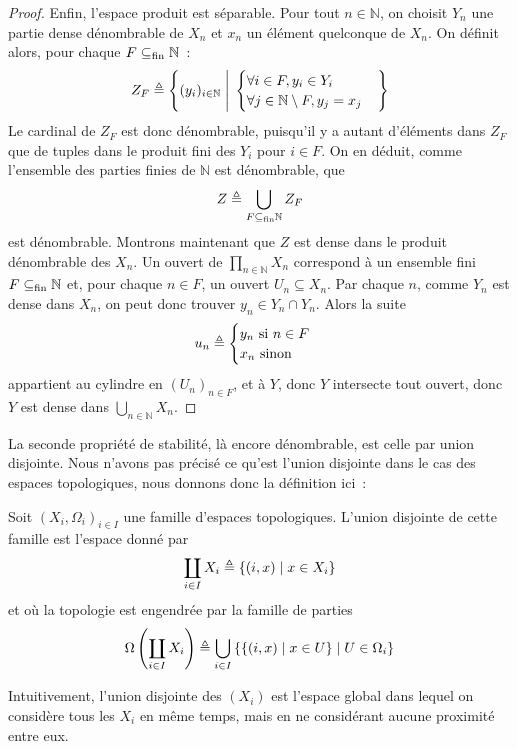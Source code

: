 \begin{proof}
  Enfin, l'espace produit est séparable. Pour tout $n \in \mathbb N$, on
  choisit $Y_n$ une partie dense dénombrable de $X_n$ et $x_n$ un élément
  quelconque de $X_n$. On définit alors, pour chaque $F\subseteq_{\mathrm{fin}} \mathbb N$~:
  \[Z_F \triangleq \left\{ (y_i)_{i \in \mathbb N} \;\Bigg|\; \begin{cases}
    \forall i \in F, y_i \in Y_i\\
    \forall j \in \mathbb N \setminus F, y_j = x_j
  \end{cases}\right\}\]
  Le cardinal de $Z_F$ est donc dénombrable, puisqu'il y a autant d'éléments
  dans $Z_F$ que de tuples dans le produit fini des $Y_i$ pour $i \in F$. On
  en déduit, comme l'ensemble des parties finies de $\mathbb N$ est dénombrable,
  que
  \[Z \triangleq \bigcup_{F\subseteq_{\mathrm{fin}} \mathbb N} Z_F\]
  est dénombrable. Montrons maintenant que $Z$ est dense dans le produit
  dénombrable des $X_n$. Un ouvert de
  $\displaystyle\prod_{n \in \mathbb N} X_n$
  correspond à un ensemble fini $F\subseteq_{\mathrm{fin}} \mathbb N$ et, pour chaque
  $n \in F$, un ouvert $U_n \subseteq X_n$. Par chaque $n$, comme $Y_n$ est
  dense dans $X_n$, on peut donc trouver $y_n \in Y_n \cap Y_n$. Alors
  la suite
  \[u_n \triangleq \begin{cases} y_n\text{ si } n \in F \\
    x_n \text{ sinon}\end{cases}\]
  appartient au cylindre en $(U_n)_{n \in F}$, et à $Y$, donc $Y$ intersecte
  tout ouvert, donc $Y$ est dense dans
  $\displaystyle \bigcup_{n \in \mathbb N} X_n$.
\end{proof}

La seconde propriété de stabilité, là encore dénombrable, est celle par union
disjointe. Nous n'avons pas précisé ce qu'est l'union disjointe dans le cas des
espaces topologiques, nous donnons donc la définition ici~:

\begin{definition}
  Soit $(X_i,\Omega_i)_{i\in I}$ une famille d'espaces topologiques. L'union
  disjointe de cette famille est l'espace donné par
  \[\coprod_{i\in I} X_i \triangleq \{(i,x)\mid x \in X_i\}\]
  et où la topologie est engendrée par la famille de parties
  \[\Omega\left(\coprod_{i\in I} X_i\right)\triangleq
  \bigcup_{i \in I}\left\{\{(i,x)\mid x\in U\}\mid U\in\Omega_i\right\}\]
\end{definition}

Intuitivement, l'union disjointe des $(X_i)$ est l'espace global dans lequel
on considère tous les $X_i$ en même temps, mais en ne considérant aucune
proximité entre eux.

